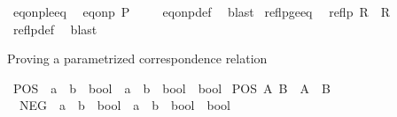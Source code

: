 \begin{isabellebody}
\ eq{\isacharunderscore}{\kern0pt}onp{\isacharunderscore}{\kern0pt}le{\isacharunderscore}{\kern0pt}eq{\isacharcolon}{\kern0pt}\isanewline
\ \ {\isachardoublequoteopen}eq{\isacharunderscore}{\kern0pt}onp\ P\ {\isasymle}\ {\isacharparenleft}{\kern0pt}{\isacharequal}{\kern0pt}{\isacharparenright}{\kern0pt}{\isachardoublequoteclose}%
\isadelimproof
\ %
\endisadelimproof
%
\isatagproof
{}\isamarkupfalse%
\ eq{\isacharunderscore}{\kern0pt}onp{\isacharunderscore}{\kern0pt}def\ \isamarkupfalse%
\ blast%
\endisatagproof
{\isafoldproof}%
%
\isadelimproof
%
\endisadelimproof
\isanewline
\isanewline
{}\isamarkupfalse%
\ reflp{\isacharunderscore}{\kern0pt}ge{\isacharunderscore}{\kern0pt}eq{\isacharcolon}{\kern0pt}\isanewline
\ \ {\isachardoublequoteopen}reflp\ R\ {\isasymLongrightarrow}\ R\ {\isasymge}\ {\isacharparenleft}{\kern0pt}{\isacharequal}{\kern0pt}{\isacharparenright}{\kern0pt}{\isachardoublequoteclose}%
\isadelimproof
\ %
\endisadelimproof
%
\isatagproof
{}\isamarkupfalse%
\ reflp{\isacharunderscore}{\kern0pt}def\ \isamarkupfalse%
\ blast%
\endisatagproof
{\isafoldproof}%
%
\isadelimproof
%
\endisadelimproof
%
\begin{isamarkuptext}%
Proving a parametrized correspondence relation%
\end{isamarkuptext}\isamarkuptrue%
\isamarkupfalse%
\ POS\ {\isacharcolon}{\kern0pt}{\isacharcolon}{\kern0pt}\ {\isachardoublequoteopen}{\isacharparenleft}{\kern0pt}{\isacharprime}{\kern0pt}a\ {\isasymRightarrow}\ {\isacharprime}{\kern0pt}b\ {\isasymRightarrow}\ bool{\isacharparenright}{\kern0pt}\ {\isasymRightarrow}\ {\isacharparenleft}{\kern0pt}{\isacharprime}{\kern0pt}a\ {\isasymRightarrow}\ {\isacharprime}{\kern0pt}b\ {\isasymRightarrow}\ bool{\isacharparenright}{\kern0pt}\ {\isasymRightarrow}\ bool{\isachardoublequoteclose}\ \isanewline
{\isachardoublequoteopen}POS\ A\ B\ {\isasymequiv}\ A\ {\isasymle}\ B{\isachardoublequoteclose}\isanewline
\isanewline
{}\isamarkupfalse%
\ \ NEG\ {\isacharcolon}{\kern0pt}{\isacharcolon}{\kern0pt}\ {\isachardoublequoteopen}{\isacharparenleft}{\kern0pt}{\isacharprime}{\kern0pt}a\ {\isasymRightarrow}\ {\isacharprime}{\kern0pt}b\ {\isasymRightarrow}\ bool{\isacharparenright}{\kern0pt}\ {\isasymRightarrow}\ {\isacharparenleft}{\kern0pt}{\isacharprime}{\kern0pt}a\ {\isasymRightarrow}\ {\isacharprime}{\kern0pt}b\ {\isasymRightarrow}\ bool{\isacharparenright}{\kern0pt}\ {\isasymRightarrow}\ bool{\isachardoublequoteclose}\ \isanewline

\end{isabellebody}
